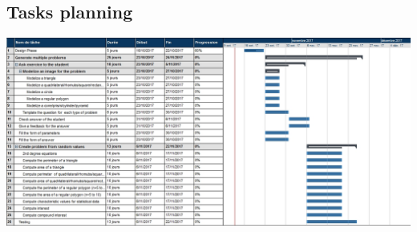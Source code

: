 \documentclass{article}
\begin{document}
\subsection{Tasks planning}
\begin{center}
    \includegraphics[scale=0.65,angle=90]{multipleproblems.jpg}
\end{center}
\end{document}
